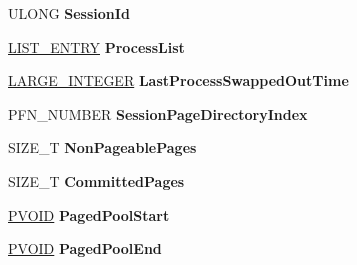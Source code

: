 \begin{DoxyCompactItemize}
\begin{tabbing}
\end{tabbing}\item 
\mbox{\label{struct___m_m___s_e_s_s_i_o_n___s_p_a_c_e_a0b91592f104936e274e137ef9f9242e4}} 
U\+L\+O\+NG {\bfseries Session\+Id}
\item 
\mbox{\label{struct___m_m___s_e_s_s_i_o_n___s_p_a_c_e_ab104182cb7776ec92a98085177246c71}} 
\hyperlink{struct___l_i_s_t___e_n_t_r_y}{L\+I\+S\+T\+\_\+\+E\+N\+T\+RY} {\bfseries Process\+List}
\item 
\mbox{\label{struct___m_m___s_e_s_s_i_o_n___s_p_a_c_e_a3984cda1d6aafdc7b2016913b44350f2}} 
\hyperlink{union___l_a_r_g_e___i_n_t_e_g_e_r}{L\+A\+R\+G\+E\+\_\+\+I\+N\+T\+E\+G\+ER} {\bfseries Last\+Process\+Swapped\+Out\+Time}
\item 
\mbox{\label{struct___m_m___s_e_s_s_i_o_n___s_p_a_c_e_a1c36915b83112d8d7ffa92bc488cd8a4}} 
P\+F\+N\+\_\+\+N\+U\+M\+B\+ER {\bfseries Session\+Page\+Directory\+Index}
\item 
\mbox{\label{struct___m_m___s_e_s_s_i_o_n___s_p_a_c_e_ac4be1b2dda53ed3725ce5b1f2bc8eb38}} 
S\+I\+Z\+E\+\_\+T {\bfseries Non\+Pageable\+Pages}
\item 
\mbox{\label{struct___m_m___s_e_s_s_i_o_n___s_p_a_c_e_aa748ed32542fcf6653cb8a33b8e68664}} 
S\+I\+Z\+E\+\_\+T {\bfseries Committed\+Pages}
\item 
\mbox{\label{struct___m_m___s_e_s_s_i_o_n___s_p_a_c_e_a398ccc5343e01fb7288d32c40823f152}} 
\hyperlink{interfacevoid}{P\+V\+O\+ID} {\bfseries Paged\+Pool\+Start}
\item 
\mbox{\label{struct___m_m___s_e_s_s_i_o_n___s_p_a_c_e_a60b656ce17db0920cbb5d8ad8db44035}} 
\hyperlink{interfacevoid}{P\+V\+O\+ID} {\bfseries Paged\+Pool\+End}
\item 
\mbox{\label{struct___m_m___s_e_s_s_i_o_n___s_p_a_c_e_afdd9edb4386f7d7a1348502b24f67d97}} 

\end{DoxyCompactItemize}
